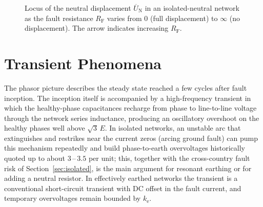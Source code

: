 \documentclass[a4paper,11pt]{article}
\newcommand{\ph}[1]{\mathrm{#1}}
\newcommand{\pE}[1]{\overline{E}_{\ph{#1}}}
\begin{document}
\begin{figure}[htb]
\centering
{}
\caption{Locus of the neutral displacement $\overline{U}_\mathrm{N}$ in an
isolated-neutral network as the fault resistance $R_\mathrm{F}$ varies from
$0$ (full displacement) to $\infty$ (no displacement). The arrow indicates
increasing $R_\mathrm{F}$.}
\label{fig:locus}
\end{figure}

\section{Transient Phenomena}
\label{sec:transients}

The phasor picture describes the steady state reached a few cycles after
fault inception. The inception itself is accompanied by a high-frequency
transient in which the healthy-phase capacitances recharge from phase to
line-to-line voltage through the network series inductance, producing an
oscillatory overshoot on the healthy phases well above $\sqrt{3}\,E$. In
isolated networks, an unstable arc that extinguishes and restrikes near the
current zeros (arcing ground fault) can pump this mechanism repeatedly and
build phase-to-earth overvoltages historically quoted up to about
$3\,$--$\,3.5$ per unit; this, together with the cross-country fault risk of
Section~\ref{sec:isolated}, is the main argument for resonant earthing or for
adding a neutral resistor. In effectively earthed networks the transient is a
conventional short-circuit transient with DC offset in the fault current, and
temporary overvoltages remain bounded by $k_\mathrm{e}$.
\end{document}
